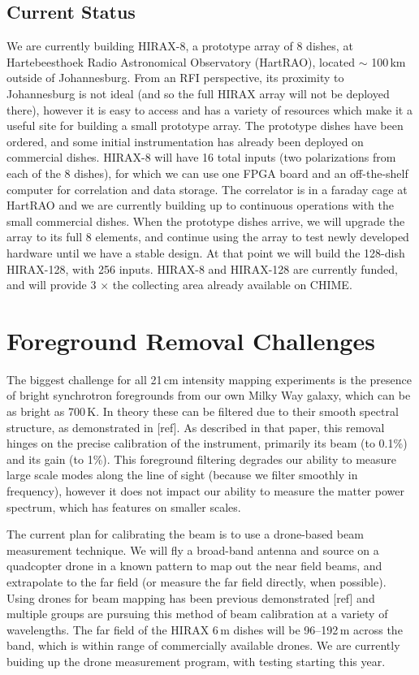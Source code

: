 \documentclass[]{spie}  %
\begin{document}
\subsection{Current Status}

We are currently building HIRAX-8, a prototype array of 8 dishes, at Hartebeesthoek Radio Astronomical Observatory (HartRAO), located $\sim$ 100\,km outside of Johannesburg. From an RFI perspective, its proximity to Johannesburg is not ideal (and so the full HIRAX array will not be deployed there), however it is easy to access and has a variety of resources which make it a useful site for building a small prototype array. The prototype dishes have been ordered, and some initial instrumentation has already been deployed on commercial dishes. HIRAX-8 will have 16 total inputs (two polarizations from each of the 8 dishes), for which we can use one FPGA board and an off-the-shelf computer for correlation and data storage. The correlator is in a faraday cage at HartRAO and we are currently building up to continuous operations with the small commercial dishes. When the prototype dishes arrive, we will upgrade the array to its full 8 elements, and continue using the array to test newly developed hardware until we have a stable design. At that point we will build the 128-dish HIRAX-128, with 256 inputs. HIRAX-8 and HIRAX-128 are currently funded, and will provide 3 $\times$ the collecting area already available on CHIME. %


\section{Foreground Removal Challenges}
\label{sec:chall}

The biggest challenge for all 21\,cm intensity mapping experiments is the presence of bright synchrotron foregrounds from our own Milky Way galaxy, which can be as bright as 700\,K. In theory these can be filtered due to their smooth spectral structure, as demonstrated in [ref]. As described in that paper, this removal hinges on the precise calibration of the instrument, primarily its beam (to 0.1\%) and its gain (to 1\%). This foreground filtering degrades our ability to measure large scale modes along the line of sight (because we filter smoothly in frequency), however it does not impact our ability to measure the matter power spectrum, which has features on smaller scales. \newline

The current plan for calibrating the beam is to use a drone-based beam measurement technique. We will fly a broad-band antenna and source on a quadcopter drone in a known pattern to map out the near field beams, and extrapolate to the far field (or measure the far field directly, when possible). Using drones for beam mapping has been previous demonstrated [ref] and multiple groups are pursuing this method of beam calibration at a variety of wavelengths. The far field of the HIRAX 6\,m dishes will be 96--192\,m across the band, which is within range of commercially available drones. We are currently buiding up the drone measurement program, with testing starting this year.\newline
\end{document}
